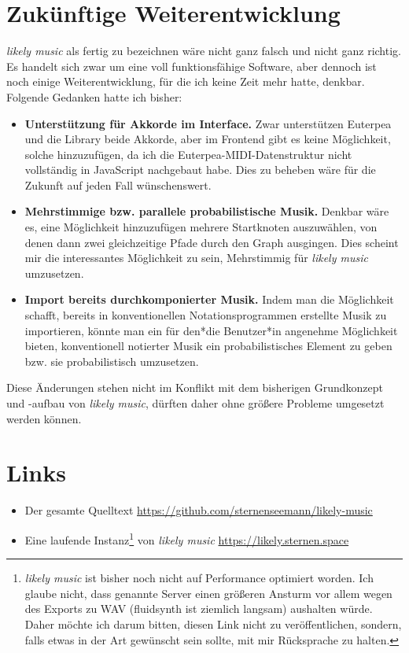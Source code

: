 \documentclass[a4paper,twocolumn]{article}
\begin{document}
\section*{Zukünftige Weiterentwicklung}

{\it likely music} als fertig zu bezeichnen wäre nicht ganz falsch und nicht
ganz richtig. Es handelt sich zwar um eine voll funktionsfähige Software, aber
dennoch ist noch einige Weiterentwicklung, für die ich keine Zeit mehr hatte,
denkbar. Folgende Gedanken hatte ich
bisher:

\begin{itemize}
  \item {\bf Unterstützung für Akkorde im Interface.} Zwar unterstützen Euterpea
    und die Library beide Akkorde, aber im Frontend gibt es keine Möglichkeit,
    solche hinzuzufügen, da ich die Euterpea-MIDI-Datenstruktur nicht
    vollständig in JavaScript nachgebaut habe. Dies zu beheben wäre für die
    Zukunft auf jeden Fall wünschenswert.
  \item {\bf Mehrstimmige bzw. parallele probabilistische Musik.} Denkbar wäre
    es, eine Möglichkeit hinzuzufügen mehrere Startknoten auszuwählen, von denen
    dann zwei gleichzeitige Pfade durch den Graph ausgingen. Dies scheint mir
    die interessantes Möglichkeit zu sein, Mehrstimmig für {\it likely music}
    umzusetzen.
  \item {\bf Import bereits durchkomponierter Musik.} Indem man die Möglichkeit
    schafft, bereits in
    konventionellen Notationsprogrammen erstellte Musik zu importieren, könnte man
    ein für den*die Benutzer*in angenehme Möglichkeit bieten, konventionell
    notierter Musik ein probabilistisches Element zu geben bzw. sie
    probabilistisch umzusetzen.
\end{itemize}

Diese Änderungen stehen nicht im Konflikt mit dem bisherigen Grundkonzept und -aufbau von
{\it likely music}, dürften daher ohne größere Probleme umgesetzt werden können.

\section*{Links}

\begin{itemize}
\item Der gesamte Quelltext \url{https://github.com/sternenseemann/likely-music}
\item Eine laufende Instanz\footnote{{\it likely music} ist bisher noch nicht
  auf Performance optimiert worden. Ich glaube nicht, dass genannte Server einen
    größeren Ansturm vor allem wegen des Exports zu WAV (fluidsynth
    \cite{fluidsynth} ist ziemlich
    langsam) aushalten würde. Daher möchte ich darum bitten, diesen Link nicht
    zu veröffentlichen, sondern, falls etwas in der Art gewünscht sein sollte,
    mit mir Rücksprache zu halten.} von {\it likely music} \url{https://likely.sternen.space}
\end{itemize}
\end{document}
